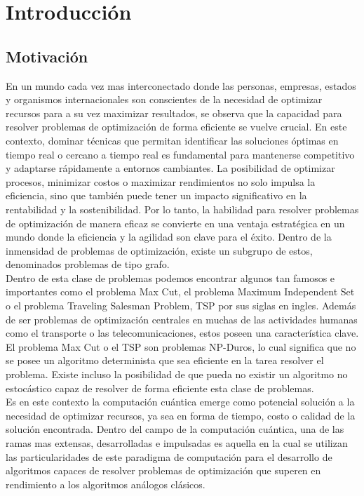 \chapter{Introducción}

\section{Motivación}

En un mundo cada vez mas interconectado donde las personas, empresas, estados y organismos internacionales son conscientes de la necesidad de optimizar recursos para a su vez maximizar resultados, se observa que la capacidad para resolver problemas de optimización de forma eficiente se vuelve crucial. En este contexto, dominar técnicas que permitan identificar las soluciones óptimas en tiempo real o cercano a tiempo real es fundamental para mantenerse competitivo y adaptarse rápidamente a entornos cambiantes. La posibilidad de optimizar procesos, minimizar costos o maximizar rendimientos no solo impulsa la eficiencia, sino que también puede tener un impacto significativo en la rentabilidad y la sostenibilidad. Por lo tanto, la habilidad para resolver problemas de optimización de manera eficaz se convierte en una ventaja estratégica en un mundo donde la eficiencia y la agilidad son clave para el éxito. Dentro de la inmensidad de problemas de optimización, existe un subgrupo de estos, denominados problemas de tipo grafo. \\

Dentro de esta clase de problemas podemos encontrar algunos tan famosos e importantes como el problema Max Cut, el problema Maximum Independent Set o el problema Traveling Salesman Problem, TSP por sus siglas en ingles. Además de ser problemas de optimización centrales en muchas de las actividades humanas como el transporte o las telecomunicaciones, estos poseen una característica clave. El problema Max Cut o el TSP son problemas NP-Duros, lo cual significa que no se posee un algoritmo determinista que sea eficiente en la tarea resolver el problema. Existe incluso la posibilidad de que pueda no existir un algoritmo no estocástico capaz de resolver de forma eficiente esta clase de problemas.\\

Es en este contexto la computación cuántica emerge como potencial solución a la necesidad de optimizar recursos, ya sea en forma de tiempo, costo o calidad de la solución encontrada. Dentro del campo de la computación cuántica, una de las ramas mas extensas, desarrolladas e impulsadas es aquella en la cual se utilizan las particularidades de este paradigma de computación para el desarrollo de algoritmos capaces de resolver problemas de optimización que superen en rendimiento a los algoritmos análogos clásicos. 


